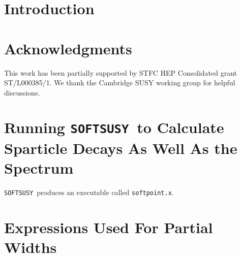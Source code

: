 \documentclass[final,3p,times,pdflatex]{elsarticle}
\def\SOFTSUSY{{\tt SOFTSUSY}}
\def\code#1{{\tt #1}}
\begin{document}
\section{Introduction}

\cite{Allanach:2001kg,Allanach:2013kza,Allanach:2009bv,Allanach:2011de,Allanach:2014nba,Allanach:2016rxd}

\section*{Acknowledgments}
This work has been partially supported by STFC HEP Consolidated grant 
ST/L000385/1. We thank the Cambridge SUSY working group for helpful
discussions. 

\appendix

\section{Running \SOFTSUSY~to Calculate Sparticle Decays As Well As the Spectrum}  
\label{sec:run}

\SOFTSUSY~produces an executable called \code{softpoint.x}. 

\section{Expressions Used For Partial Widths}





\end{document}

